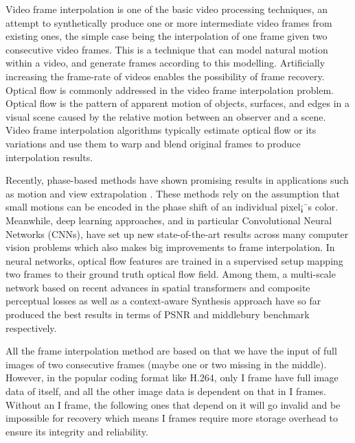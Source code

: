 \documentclass[sigconf]{acmart}
\begin{document}
Video frame interpolation is one of the basic video processing techniques, an attempt to synthetically produce one or more intermediate video frames from existing ones, the simple case being the interpolation of one frame given two consecutive video frames. This is a technique that can model natural motion within a video, and generate frames according to this modelling. Artificially increasing the frame-rate of videos enables the possibility of frame recovery. Optical flow is commonly addressed in the video frame interpolation problem. Optical flow is the pattern of apparent motion of objects, surfaces, and edges in a visual scene caused by the relative motion between an observer and a scene. Video frame interpolation algorithms typically estimate optical flow or its variations and use them to warp and blend original frames to produce interpolation results.

Recently, phase-based methods have shown promising results in applications such as motion and view extrapolation \cite{didyk2013joint}\cite{wadhwa2013phase}\cite{meyer2015phase}. These methods rely on the assumption that small motions can be encoded in the phase shift of an individual pixel¡¯s color. Meanwhile, deep learning approaches, and in particular Convolutional Neural Networks (CNNs), have set up new state-of-the-art results across many computer vision problems which also makes big improvements to frame interpolation. In neural networks, optical flow features are trained in a supervised setup mapping two frames to their ground truth optical flow field\cite{dosovitskiy2015flownet}\cite{ilg2017flownet}. Among them, a multi-scale network\cite{van2017frame} based on recent advances in spatial transformers and composite perceptual losses as well as a context-aware Synthesis approach\cite{niklaus2018context} have so far produced the best results in terms of PSNR and middlebury benchmark respectively.

All the frame interpolation method are based on that we have the input of full images of two consecutive frames (maybe one or two missing in the middle). However, in the popular coding format like H.264, only I frame have full image data of itself, and all the other image data is dependent on that in I frames. Without an I frame, the following ones that depend on it will go invalid and be impossible for recovery which means I frames require more storage overhead to ensure its integrity and reliability.
\end{document}
